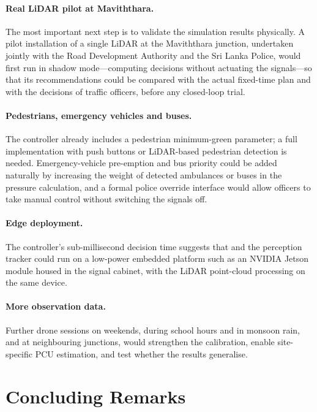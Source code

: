 \paragraph{Real LiDAR pilot at Maviththara.} The most important next step is to validate the simulation results physically. A pilot installation of a single LiDAR at the Maviththara junction, undertaken jointly with the Road Development Authority and the Sri Lanka Police, would first run \prism{} in shadow mode---computing decisions without actuating the signals---so that its recommendations could be compared with the actual fixed-time plan and with the decisions of traffic officers, before any closed-loop trial.

\paragraph{Pedestrians, emergency vehicles and buses.} The controller already includes a pedestrian minimum-green parameter; a full implementation with push buttons or LiDAR-based pedestrian detection is needed. Emergency-vehicle pre-emption and bus priority could be added naturally by increasing the weight of detected ambulances or buses in the pressure calculation, and a formal police override interface would allow officers to take manual control without switching the signals off.

\paragraph{Edge deployment.} The controller's sub-millisecond decision time suggests that \prism{} and the perception tracker could run on a low-power embedded platform such as an NVIDIA Jetson module housed in the signal cabinet, with the LiDAR point-cloud processing on the same device.

\paragraph{More observation data.} Further drone sessions on weekends, during school hours and in monsoon rain, and at neighbouring junctions, would strengthen the calibration, enable site-specific PCU estimation, and test whether the results generalise.

\section{Concluding Remarks}

